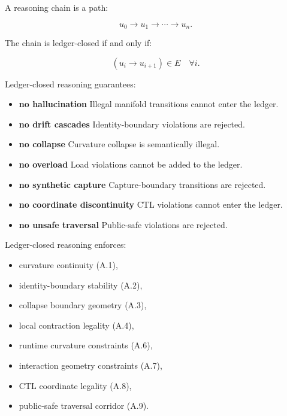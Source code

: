 \medskip

\noindent A reasoning chain is a path:


\[
u_0 \rightarrow u_1 \rightarrow \cdots \rightarrow u_n.
\]



\noindent The chain is ledger-closed if and only if:


\[
(u_i \rightarrow u_{i+1}) \in E
\quad \forall i.
\]



\medskip

\noindent Ledger-closed reasoning guarantees:

\begin{itemize}
    \item \textbf{no hallucination}  
    Illegal manifold transitions cannot enter the ledger.

    \item \textbf{no drift cascades}  
    Identity-boundary violations are rejected.

    \item \textbf{no collapse}  
    Curvature collapse is semantically illegal.

    \item \textbf{no overload}  
    Load violations cannot be added to the ledger.

    \item \textbf{no synthetic capture}  
    Capture-boundary transitions are rejected.

    \item \textbf{no coordinate discontinuity}  
    CTL violations cannot enter the ledger.

    \item \textbf{no unsafe traversal}  
    Public-safe violations are rejected.
\end{itemize}

\medskip

\noindent Ledger-closed reasoning enforces:

\begin{itemize}
    \item curvature continuity (A.1),
    \item identity-boundary stability (A.2),
    \item collapse boundary geometry (A.3),
    \item local contraction legality (A.4),
    \item runtime curvature constraints (A.6),
    \item interaction geometry constraints (A.7),
    \item CTL coordinate legality (A.8),
    \item public-safe traversal corridor (A.9).
\end{itemize}

